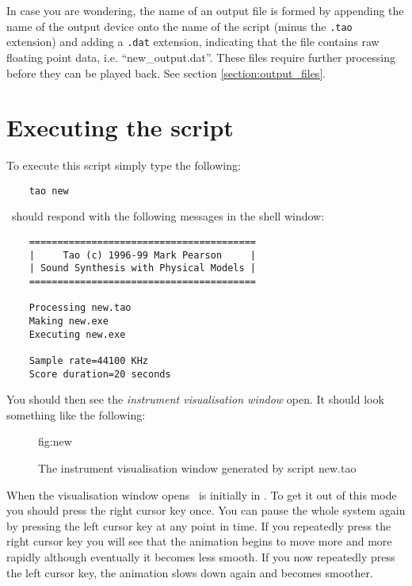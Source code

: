 In case you are wondering, the name of an output file is formed
by appending the name of the output device onto the name of the
script (minus the \verb|.tao| extension) and adding a \verb|.dat|
extension, indicating that the file contains raw floating point data,
i.e. ``new\_output.dat''. These files require further processing before
they can be played back. See section \ref{section:output_files}.

\section{Executing the script}
To execute this script simply type the following:

\begin{verbatim}
    tao new
\end{verbatim}

\tao\ should respond with the following messages in the shell window:

\begin{verbatim}
    ========================================
    |     Tao (c) 1996-99 Mark Pearson     |
    | Sound Synthesis with Physical Models |
    ========================================

    Processing new.tao
    Making new.exe
    Executing new.exe

    Sample rate=44100 KHz
    Score duration=20 seconds                
\end{verbatim}

You should then see the \emph{instrument visualisation window}
open. It should look something like the following:

\begin{figure}[h]
  \begin{Label}{fig:new}
    \begin{center}
    \end{center}
    \caption{The instrument visualisation window generated by script new.tao}
  \end{Label}
\end{figure}    

When the visualisation window opens \tao\ is initially in .
To get it out of this mode you should press the right cursor key once.
You can pause the whole system again by pressing the left cursor key at
any point in time. If you repeatedly press the right cursor key you will
see that the animation begins to move more and more rapidly although eventually
it becomes less smooth. If you now repeatedly press the left cursor
key, the animation slows down again and becomes smoother.

